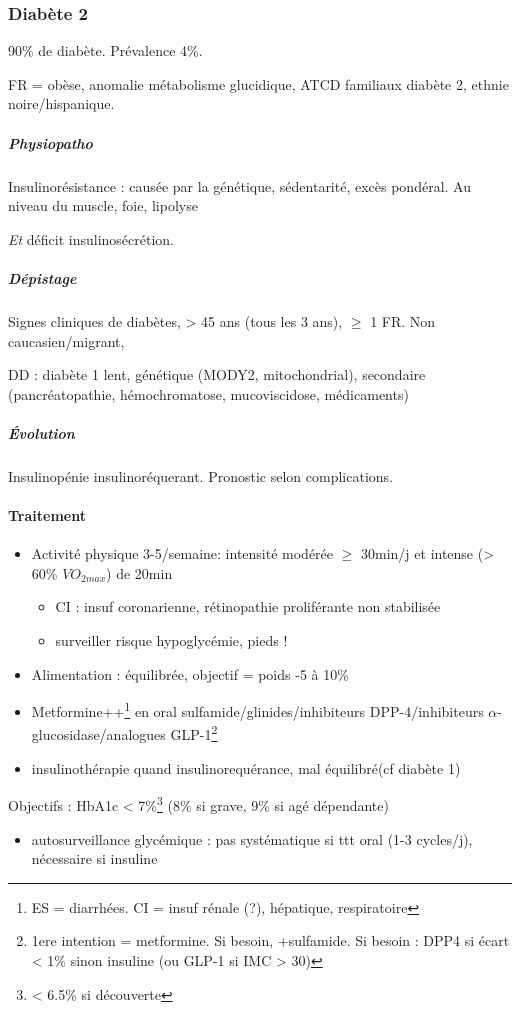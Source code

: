 \documentclass[11pt]{article}
\begin{document}
\subsubsection{Diabète 2}
\label{sec:org828de7e}
90\% de diabète. Prévalence 4\%. 

FR = obèse, anomalie métabolisme glucidique, ATCD familiaux diabète 2, ethnie noire/hispanique.

\subparagraph{Physiopatho}
\label{sec:org45a8a64}
Insulinorésistance : causée par la génétique, sédentarité, excès pondéral. Au niveau du muscle, foie, lipolyse

\emph{Et} déficit insulinosécrétion. 

\subparagraph{Dépistage}
\label{sec:org8a7560d}
Signes cliniques de diabètes, > 45 ans (tous les 3 ans), \(\ge\) 1 FR. 
 Non caucasien/migrant, 

DD : diabète 1 lent, génétique (MODY2, mitochondrial), secondaire (pancréatopathie, hémochromatose,
mucoviscidose, médicaments)

\subparagraph{Évolution}
\label{sec:org4f1d702}
Insulinopénie \thus insulinoréquerant. Pronostic selon complications.

\paragraph{Traitement}
\label{sec:orge0f86cf}
\begin{itemize}
\item Activité physique 3-5/semaine: intensité modérée \(\ge\) 30min/j et intense (> 60\% \(VO_{2max}\)) de 20min
\begin{itemize}
\item CI : insuf coronarienne, rétinopathie proliférante non stabilisée
\item surveiller risque hypoglycémie, pieds !
\end{itemize}
\item Alimentation : équilibrée, objectif = poids -5 à 10\%
\item Metformine++\footnote{ES = diarrhées. CI = insuf rénale (?), hépatique, respiratoire} en oral \textpm{} sulfamide/glinides/inhibiteurs
DPP-4/inhibiteurs \(\alpha\)-glucosidase/analogues GLP-1\footnote{1ere intention = metformine. Si besoin, +sulfamide. Si besoin : DPP4 si
écart < 1\% sinon insuline (ou GLP-1 si IMC > 30)}
\item \textpm{} insulinothérapie quand insulinorequérance, mal équilibré(cf diabète 1)
\end{itemize}
Objectifs : HbA1c < 7\%\footnote{< 6.5\% si découverte} (8\% si grave, 9\% si agé dépendante)
\begin{itemize}
\item autosurveillance glycémique : pas systématique si ttt oral (1-3 cycles/j),
nécessaire si insuline
\end{itemize}
\end{document}
